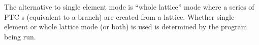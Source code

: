 The alternative to single element mode is ``whole lattice'' mode where
a series of PTC s (equivalent to a \bmad branch) are
created from a \bmad lattice. Whether single element or whole lattice
mode (or both) is used is determined by the program being run.

